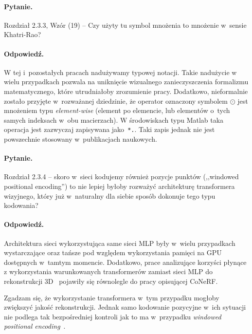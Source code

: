\documentclass{rebuttal}
\begin{document}
  \responsedelimiter

\paragraph{Pytanie.}
  Rozdział 2.3.3, Wzór (19) -- Czy użyty tu symbol mnożenia to mnożenie w~sensie
  Khatri-Rao?

\paragraph{Odpowiedź.}
  W tej i~pozostałych pracach nadużywamy typowej notacji. Takie nadużycie w
  wielu przypadkach pozwala na uniknięcie wizualnego zanieczyszczenia formalizmu
  matematycznego, które utrudniałoby zrozumienie pracy. Dodatkowo, nieformalnie
  zostało przyjęte w~rozważanej dziedzinie, że operator oznaczony symbolem
  $\odot$ jest mnożeniem typu \textit{element-wise} (element po elemencie, lub
  elementów o~tych samych indeksach w~obu macierzach). W środowiskach typu
  Matlab taka operacja jest zazwyczaj zapisywana jako~\texttt{*.}. Taki zapis
  jednak nie jest powszechnie stosowany w~publikacjach naukowych.

  \responsedelimiter

\paragraph{Pytanie.}
  Rozdział 2.3.4 -- skoro w~sieci kodujemy również pozycje punktów (,,windowed
  positional encoding'') to nie lepiej byłoby rozważyć architekturę transformera
  wizyjnego, który już w~naturalny dla siebie sposób dokonuje tego typu
  kodowania?
\paragraph{Odpowiedź.}
  Architektura sieci wykorzystująca same sieci MLP były w~wielu przypadkach
  wystarczające oraz tańsze pod względem wykorzystania pamięci na GPU dostępnych
  w~tamtym momencie. Dodatkowo, prace analizujące korzyści płynące z
  wykorzystania warunkowanych transformerów zamiast sieci MLP do rekonstrukcji
  3D~\cite{rebain2023attention} pojawiły się równolegle do pracy opisującej
  CoNeRF.

  Zgadzam się, że wykorzystanie transformera w~tym przypadku mogłoby zwiększyć
  jakość rekonstrukcji. Jednak samo kodowanie pozycyjne w~ich sytuacji nie
  podlega tak bezpośredniej kontroli jak to ma w~przypadku \textit{windowed
    positional encoding}~\cite{park2021nerfies}.
\end{document}
